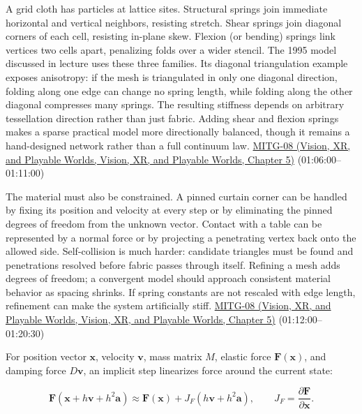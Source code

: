 A grid cloth has particles at lattice sites. Structural springs join immediate horizontal and vertical neighbors, resisting stretch. Shear springs join diagonal corners of each cell, resisting in-plane skew. Flexion (or bending) springs link vertices two cells apart, penalizing folds over a wider stencil. The 1995 model discussed in lecture uses these three families. Its diagonal triangulation example exposes anisotropy: if the mesh is triangulated in only one diagonal direction, folding along one edge can change no spring length, while folding along the other diagonal compresses many springs. The resulting stiffness depends on arbitrary tessellation direction rather than just fabric. Adding shear and flexion springs makes a sparse practical model more directionally balanced, though it remains a hand-designed network rather than a full continuum law. \href{../07-Vision-XR-and-Playable-Worlds/main.pdf\#nameddest=04-visual-computing-ii-ch036-mitg-08---cloth-simulation}{MITG-08 (Vision, XR, and Playable Worlds, Vision, XR, and Playable Worlds, Chapter 5)} (01:06:00--01:11:00)

The material must also be constrained. A pinned curtain corner can be handled by fixing its position and velocity at every step or by eliminating the pinned degrees of freedom from the unknown vector. Contact with a table can be represented by a normal force or by projecting a penetrating vertex back onto the allowed side. Self-collision is much harder: candidate triangles must be found and penetrations resolved before fabric passes through itself. Refining a mesh adds degrees of freedom; a convergent model should approach consistent material behavior as spacing shrinks. If spring constants are not rescaled with edge length, refinement can make the system artificially stiff. \href{../07-Vision-XR-and-Playable-Worlds/main.pdf\#nameddest=04-visual-computing-ii-ch036-mitg-08---cloth-simulation}{MITG-08 (Vision, XR, and Playable Worlds, Vision, XR, and Playable Worlds, Chapter 5)} (01:12:00--01:20:30)

For position vector \(\boldsymbol{x}\), velocity \(\boldsymbol{v}\), mass matrix \(M\), elastic force \(\boldsymbol{F}(\boldsymbol{x})\), and damping force \(D\boldsymbol{v}\), an implicit step linearizes force around the current state:

\[
\boldsymbol{F}(\boldsymbol{x}+h\boldsymbol{v}+h^2\boldsymbol{a})
\approx \boldsymbol{F}(\boldsymbol{x})
+J_F(h\boldsymbol{v}+h^2\boldsymbol{a}),
\qquad J_F=\frac{\partial \boldsymbol{F}}{\partial \boldsymbol{x}}.
\]

